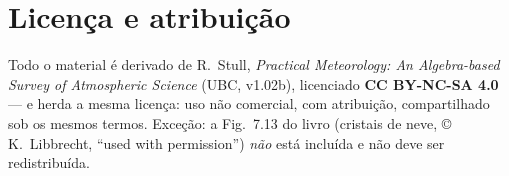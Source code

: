 \documentclass[11pt]{article}
\begin{document}
\section*{Licença e atribuição}

Todo o material é derivado de R.~Stull, \emph{Practical Meteorology:
An Algebra-based Survey of Atmospheric Science} (UBC, v1.02b),
licenciado \textbf{CC BY-NC-SA 4.0} — e herda a mesma licença: uso
não comercial, com atribuição, compartilhado sob os mesmos termos.
Exceção: a Fig.~7.13 do livro (cristais de neve, © K.~Libbrecht,
``used with permission'') \emph{não} está incluída e não deve ser
redistribuída.
\end{document}
